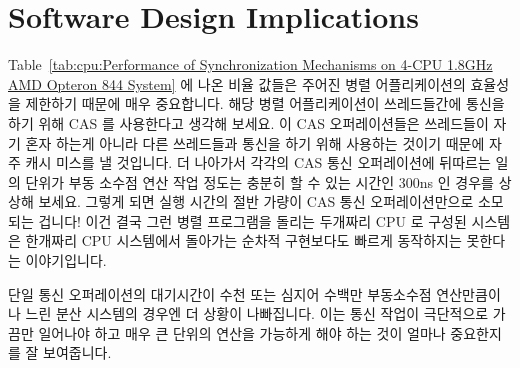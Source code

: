 
\section{Software Design Implications}
\label{sec:cpu:Software Design Implications}

Table~\ref{tab:cpu:Performance of Synchronization Mechanisms on 4-CPU 1.8GHz
AMD Opteron 844 System} 에 나온 비율 값들은 주어진 병렬 어플리케이션의 효율성을
제한하기 때문에 매우 중요합니다.
해당 병렬 어플리케이션이 쓰레드들간에 통신을 하기 위해 CAS 를 사용한다고 생각해
보세요.
이 CAS 오퍼레이션들은 쓰레드들이 자기 혼자 하는게 아니라 다른 쓰레드들과 통신을
하기 위해 사용하는 것이기 때문에 자주 캐시 미스를 낼 것입니다.
더 나아가서 각각의 CAS 통신 오퍼레이션에 뒤따르는 일의 단위가 부동 소수점 연산
작업 정도는 충분히 할 수 있는 시간인 300ns 인 경우를 상상해 보세요.
그렇게 되면 실행 시간의 절반 가량이 CAS 통신 오퍼레이션만으로 소모되는 겁니다!
이건 결국 그런 병렬 프로그램을 돌리는 두개짜리 CPU 로 구성된 시스템은 한개짜리
CPU 시스템에서 돌아가는 순차적 구현보다도 빠르게 동작하지는 못한다는
이야기입니다.

단일 통신 오퍼레이션의 대기시간이 수천 또는 심지어 수백만 부동소수점
연산만큼이나 느린 분산 시스템의 경우엔 더 상황이 나빠집니다.
이는 통신 작업이 극단적으로 가끔만 일어나야 하고 매우 큰 단위의 연산을 가능하게
해야 하는 것이 얼마나 중요한지를 잘 보여줍니다.

\iffalse
The values of the ratios in
Table~\ref{tab:cpu:Performance of Synchronization Mechanisms on 4-CPU 1.8GHz AMD Opteron 844 System}
are critically important, as they limit the
efficiency of a given parallel application.
To see this, suppose that the parallel application uses CAS
operations to communicate among threads.
These CAS operations will typically involve a cache miss, that is, assuming
that the threads are communicating primarily with each other rather than
with themselves.
Suppose further that the unit of work corresponding to each CAS communication
operation takes 300\,ns, which is sufficient time to compute several
floating-point transcendental functions.
Then about half of the execution time will be consumed by the CAS
communication operations!
This in turn means that a two-CPU system running such a parallel program
would run no faster than a sequential implementation running on a
single CPU.

The situation is even worse in the distributed-system case, where the
latency of a single communications operation might take as long as
thousands or even millions of floating-point operations.
This illustrates how important it is for communications operations to
be extremely infrequent and to enable very large quantities of processing.
\fi


